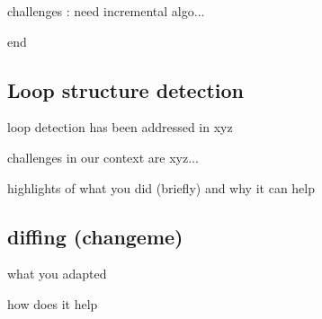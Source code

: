 challenges : need incremental algo...

end




\subsection{Loop structure detection}

loop detection has been addressed in xyz

challenges in our context are xyz...

highlights of what you did (briefly) and why it can help

\subsection{diffing (changeme)}


what you adapted

how does it help

\cite{diff-myers}
